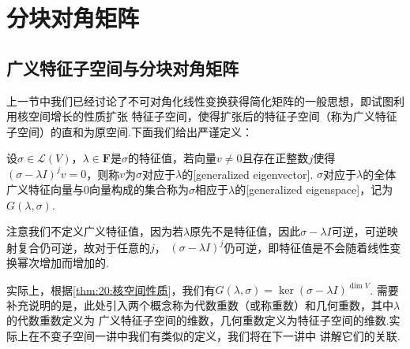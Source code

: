 \section{分块对角矩阵}
\subsection{广义特征子空间与分块对角矩阵}
上一节中我们已经讨论了不可对角化线性变换获得简化矩阵的一般思想，即试图利用核空间增长的性质扩张
特征子空间，使得扩张后的特征子空间（称为广义特征子空间）的直和为原空间.下面我们给出严谨定义：
\begin{definition}
    设$\sigma\in \mathcal{L}(V)$，$\lambda\in\mathbf{F}$是$\sigma$的特征值，若向量$v\neq 0$且存在正整数$j$使得
    $(\sigma-\lambda I)^jv=0$，则称$v$为$\sigma$对应于$\lambda$的[generalized eigenvector].
    $\sigma$对应于$\lambda$的全体广义特征向量与0向量构成的集合称为$\sigma$相应于$\lambda$的[generalized eigenspace]，记为$G(\lambda,\sigma)$.
\end{definition}
注意我们不定义广义特征值，因为若$\lambda$原先不是特征值，因此$\sigma-\lambda I$可逆，可逆映射复合仍可逆，故对于任意的$j$，
$(\sigma-\lambda I)^j$仍可逆，即特征值是不会随着线性变换幂次增加而增加的.

实际上，根据\autoref{thm:20:核空间性质}，我们有$G(\lambda,\sigma)=\ker (\sigma-\lambda I)^{\dim V}$.
需要补充说明的是，此处引入两个概念称为代数重数（或称重数）和几何重数，其中$\lambda$的代数重数定义为
广义特征子空间的维数，几何重数定义为特征子空间的维数.实际上在不变子空间一讲中我们有类似的定义，我们将在下一讲中
讲解它们的关联.

